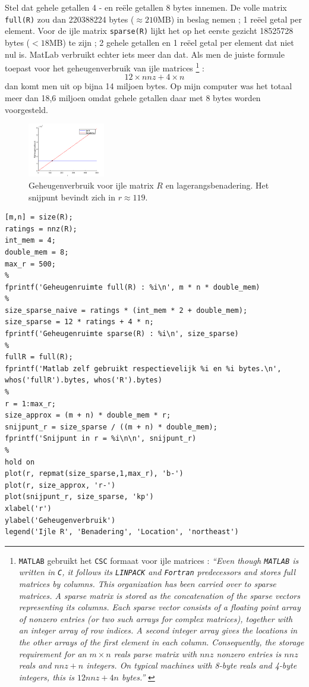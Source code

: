 Stel dat gehele getallen 4 - en re\"ele getallen 8 bytes innemen. De volle matrix \texttt{full(R)} zou dan 220388224 bytes ($\approx 210$MB) in beslag nemen ; 1 re\"eel getal per element. Voor de ijle matrix \texttt{sparse(R)} lijkt het op het eerste gezicht 18525728 bytes ($< 18$MB) te zijn ; 2 gehele getallen en 1 re\"eel getal per element dat niet nul is. MatLab verbruikt echter iets meer dan dat. Als men de juiste formule toepast voor het geheugenverbruik van ijle matrices \footnote{\texttt{MATLAB} gebruikt het \texttt{CSC} formaat voor ijle matrices : \textit{``Even though \texttt{MATLAB} is written in \texttt{C}, it follows its \texttt{LINPACK} and \texttt{Fortran} predecessors and stores full matrices by columns. This organization has been carried over to sparse matrices. A sparse matrix is stored as the concatenation of the sparse vectors representing its columns. Each sparse vector consists of a floating point array of nonzero entries (or two such arrays for complex matrices), together with an integer array of row indices. A second integer array gives the locations in the other arrays of the first element in each column. Consequently, the storage requirement for an $m\times n$ reals parse matrix with $nnz$ nonzero entries is $nnz$ reals and $nnz+n$ integers. On typical machines with 8-byte reals and 4-byte integers, this is $12nnz+4n$ bytes.''} \cite{Gilbert1992}} :
$$12\times nnz+4\times n$$
dan komt men uit op bijna 14 miljoen bytes. Op mijn computer was het totaal meer dan 18,6 miljoen omdat gehele getallen daar met 8 bytes worden voorgesteld.

\begin{figure}[h]
\centering
\includegraphics[width=0.3\textwidth]{res/op2.png}
\caption{Geheugenverbruik voor ijle matrix $R$ en lagerangsbenadering. Het snijpunt bevindt zich in $r\approx 119$.}
\label{fig:op2}
\end{figure}

\begin{lstlisting}
[m,n] = size(R);
ratings = nnz(R);
int_mem = 4;
double_mem = 8;
max_r = 500;
%
fprintf('Geheugenruimte full(R) : %i\n', m * n * double_mem)
%
size_sparse_naive = ratings * (int_mem * 2 + double_mem);
size_sparse = 12 * ratings + 4 * n;
fprintf('Geheugenruimte sparse(R) : %i\n', size_sparse)
%
fullR = full(R);
fprintf('Matlab zelf gebruikt respectievelijk %i en %i bytes.\n', whos('fullR').bytes, whos('R').bytes)
%
r = 1:max_r;
size_approx = (m + n) * double_mem * r;
snijpunt_r = size_sparse / ((m + n) * double_mem);
fprintf('Snijpunt in r = %i\n\n', snijpunt_r)
%
hold on
plot(r, repmat(size_sparse,1,max_r), 'b-')
plot(r, size_approx, 'r-')
plot(snijpunt_r, size_sparse, 'kp')
xlabel('r')
ylabel('Geheugenverbruik')
legend('Ijle R', 'Benadering', 'Location', 'northeast') 
\end{lstlisting}

